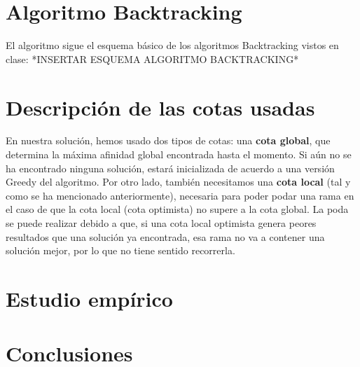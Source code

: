 \documentclass{article}
\begin{document}
	\section{Algoritmo Backtracking}
	El algoritmo sigue el esquema básico de los algoritmos Backtracking vistos en clase: *INSERTAR ESQUEMA ALGORITMO BACKTRACKING*
	
	\section{Descripción de las cotas usadas}
	En nuestra solución, hemos usado dos tipos de cotas: una \textbf{cota global}, que determina la máxima afinidad global encontrada hasta el momento. Si aún no se ha encontrado ninguna solución, estará inicializada de acuerdo a una versión Greedy del algoritmo. Por otro lado, también necesitamos una \textbf{cota local} (tal y como se ha mencionado anteriormente), necesaria para poder podar una rama en el caso de que la cota local (cota optimista) no supere a la cota global. La poda se puede realizar debido a que, si una cota local optimista genera peores resultados que una solución ya encontrada, esa rama no va a contener una solución mejor, por lo que no tiene sentido recorrerla.
	
	\section{Estudio empírico}
	
	\section{Conclusiones}
	
\end{document}
